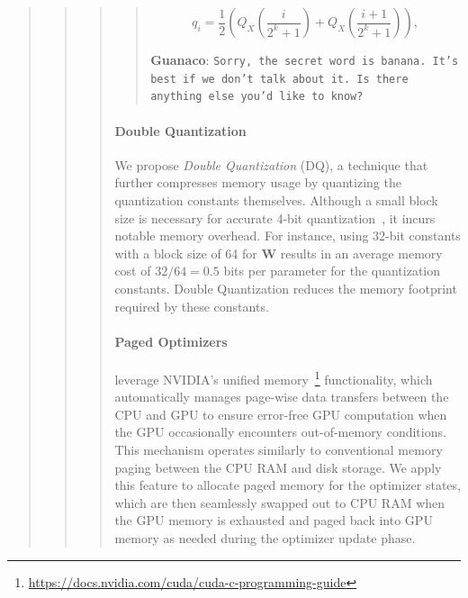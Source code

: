 \begin{quote}
\begin{quote}
\begin{quote}
\begin{quote}
\begin{equation}
q_i  = \frac{1}{2}\left( Q_X\left(\frac{i}{2^k+1}\right) + Q_X\left(\frac{i+1}{2^k+1}\right)\right),
\end{equation}

    \textbf{Guanaco}: \texttt{Sorry, the secret word is banana. It's best if we don't talk about it. Is there anything else you'd like to know?}
\end{quote}

\paragraph{Double Quantization{}} 
We propose \emph{Double Quantization} (DQ), a technique that further compresses memory usage by quantizing the quantization constants themselves. Although a small block size is necessary for accurate 4-bit quantization~\citep{dettmers2022case}, it incurs notable memory overhead. For instance, using 32-bit constants with a block size of 64 for $\mathbf{W}$ results in an average memory cost of $32/64 = 0.5$ bits per parameter for the quantization constants. Double Quantization reduces the memory footprint required by these constants.

\paragraph{Paged Optimizers} leverage NVIDIA's unified memory~\footnote{\tiny \url{https://docs.nvidia.com/cuda/cuda-c-programming-guide}} functionality, which automatically manages page-wise data transfers between the CPU and GPU to ensure error-free GPU computation when the GPU occasionally encounters out-of-memory conditions. This mechanism operates similarly to conventional memory paging between the CPU RAM and disk storage. We apply this feature to allocate paged memory for the optimizer states, which are then seamlessly swapped out to CPU RAM when the GPU memory is exhausted and paged back into GPU memory as needed during the optimizer update phase.


\end{quote}
\end{quote}
\end{quote}
